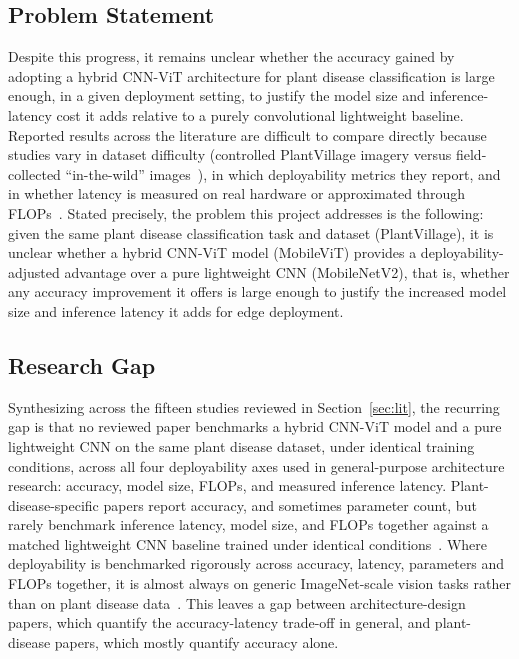 \documentclass[conference]{IEEEtran}
\begin{document}
\subsection{Problem Statement}

Despite this progress, it remains unclear whether the accuracy gained by adopting a hybrid CNN-ViT architecture for plant disease classification is large enough, in a given deployment setting, to justify the model size and inference-latency cost it adds relative to a purely convolutional lightweight baseline. Reported results across the literature are difficult to compare directly because studies vary in dataset difficulty (controlled PlantVillage imagery versus field-collected ``in-the-wild'' images~\cite{kumar2025mobilefriendly}), in which deployability metrics they report, and in whether latency is measured on real hardware or approximated through FLOPs~\cite{ma2018shufflenetv2}. Stated precisely, the problem this project addresses is the following: given the same plant disease classification task and dataset (PlantVillage), it is unclear whether a hybrid CNN-ViT model (MobileViT) provides a deployability-adjusted advantage over a pure lightweight CNN (MobileNetV2), that is, whether any accuracy improvement it offers is large enough to justify the increased model size and inference latency it adds for edge deployment.

\subsection{Research Gap}

Synthesizing across the fifteen studies reviewed in Section~\ref{sec:lit}, the recurring gap is that no reviewed paper benchmarks a hybrid CNN-ViT model and a pure lightweight CNN on the same plant disease dataset, under identical training conditions, across all four deployability axes used in general-purpose architecture research: accuracy, model size, FLOPs, and measured inference latency. Plant-disease-specific papers report accuracy, and sometimes parameter count, but rarely benchmark inference latency, model size, and FLOPs together against a matched lightweight CNN baseline trained under identical conditions~\cite{mohanty2016plant,thakur2023vitcnn,li2023pmvt,tonmoy2025mobileplantvit,karthikeyan2025cnnseeib,pal2025mobres,baek2025multivit,murugavalli2025plavit,aboelenin2025hybrid}. Where deployability is benchmarked rigorously across accuracy, latency, parameters and FLOPs together, it is almost always on generic ImageNet-scale vision tasks rather than on plant disease data~\cite{dosovitskiy2021vit,sandler2018mobilenetv2,ma2018shufflenetv2,mehta2022mobilevit,mehta2022mobilevitv2}. This leaves a gap between architecture-design papers, which quantify the accuracy-latency trade-off in general, and plant-disease papers, which mostly quantify accuracy alone.
\end{document}
